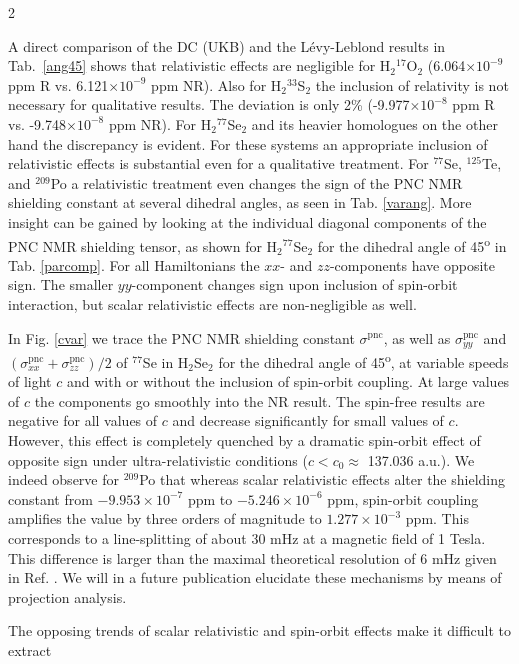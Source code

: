\documentclass[a4paper,12pt,english]{article}
\begin{document}
\begin{spacing}{2}
\par A direct comparison of the DC (UKB) and the L\'evy-Leblond results in \mbox{Tab. \ref{ang45}} 
shows that relativistic effects are negligible for H$_2{^{17}}$O$_2$ (6.064$\times 10^{-9}$ 
ppm R vs. 6.121$\times 10^{-9}$ ppm NR). Also for H$_2{^{33}}$S$_2$ 
the inclusion of relativity is not necessary for qualitative results. The deviation is only 2\% 
(-9.977$\times 10^{-8}$ ppm R vs. -9.748$\times 10^{-8}$ ppm NR). For H$_2{^{77}}$Se$_2$ and its heavier homologues on the other hand the discrepancy is evident. For 
these systems an appropriate inclusion of relativistic effects is substantial even for a qualitative 
treatment. For $^{77}$Se, $^{125}$Te, and $^{209}$Po a relativistic treatment even changes the sign 
of the PNC NMR shielding constant at several dihedral angles, as seen in Tab. \ref{varang}. 
More insight can be gained by looking at 
the individual diagonal components of the PNC NMR shielding tensor, as shown for H$_2{^{77}}$Se$_2$ for the
dihedral angle of 45\textsuperscript{o} in Tab. \ref{parcomp}. For all Hamiltonians the $xx$- and $zz$-components
have opposite sign. The smaller $yy$-component changes sign upon inclusion of spin-orbit interaction,
but scalar relativistic effects are non-negligible as well.
\par In Fig. \ref{cvar} we trace the PNC NMR shielding constant $\sigma^\text{pnc}$, as well 
as $\sigma_{yy}^\text{pnc}$ and $(\sigma_{xx}^\text{pnc}+\sigma_{zz}^\text{pnc})/2$ of $^{77}$Se in 
H$_2$Se$_2$ for the dihedral angle of 45\textsuperscript{o}, at variable speeds of light $c$ and with or without 
the inclusion of spin-orbit coupling. At large values of $c$ the components go smoothly into the 
NR result. The spin-free results are negative for all values of $c$ and decrease significantly
for small values of $c$. However, this effect is completely quenched by a dramatic spin-orbit effect of
opposite sign under ultra-relativistic conditions ($c < c_0 \approx$ 137.036 a.u.). We indeed observe for
$^{209}$Po that whereas scalar relativistic effects alter the shielding constant from $-9.953\times10^{-7 }$ ppm to
$-5.246\times 10^{-6 }$ ppm, spin-orbit coupling amplifies the value by three orders of magnitude to
$1.277\times 10^{-3 }$ ppm. This corresponds to a line-splitting of about 30 mHz at a magnetic field of 1 Tesla. This difference is larger than the maximal theoretical resolution of 6 mHz given in Ref. \cite{barra2001chirality}. We will in a future publication elucidate these mechanisms by means of
projection analysis.
\par The opposing trends of scalar relativistic and spin-orbit effects make it difficult to extract 

\end{spacing}
\end{document}
